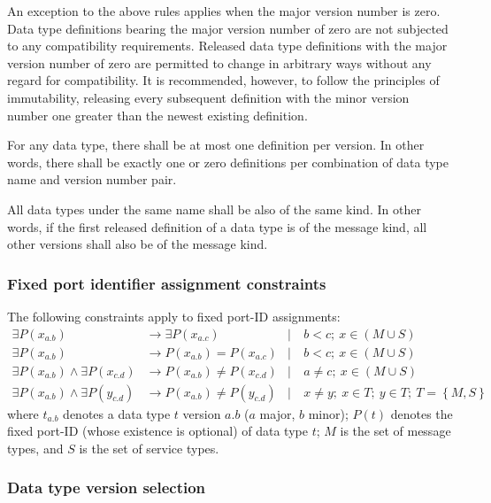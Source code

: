 An exception to the above rules applies when the major version number is zero.
Data type definitions bearing the major version number of zero are not subjected to any compatibility requirements.
Released data type definitions with the major version number of zero are permitted to change in arbitrary
ways without any regard for compatibility.
It is recommended, however, to follow the principles of immutability, releasing every subsequent definition
with the minor version number one greater than the newest existing definition.

For any data type, there shall be at most one definition per version.
In other words, there shall be exactly one or zero definitions
per combination of data type name and version number pair.

All data types under the same name shall be also of the same kind.
In other words, if the first released definition of a data type is of the message kind,
all other versions shall also be of the message kind.

\subsubsection{Fixed port identifier assignment constraints}

The following constraints apply to fixed port-ID assignments:
\begin{align*}
    \exists P(x_{a.b})                          &\rightarrow \exists P(x_{a.c})
    &\mid&\ b < c;\ x \in (M \cup S)
    \\
    \exists P(x_{a.b})                          &\rightarrow         P(x_{a.b}) =    P(x_{a.c})
    &\mid&\ b < c;\ x \in (M \cup S)
    \\
    \exists P(x_{a.b}) \land \exists P(x_{c.d}) &\rightarrow         P(x_{a.b}) \neq P(x_{c.d})
    &\mid&\ a \neq c;\ x \in (M \cup S)
    \\
    \exists P(x_{a.b}) \land \exists P(y_{c.d}) &\rightarrow         P(x_{a.b}) \neq P(y_{c.d})
    &\mid&\ x \neq y;\ x \in T;\ y \in T;\ T = \left\{ M, S \right\}
\end{align*}
where $t_{a.b}$ denotes a data type $t$ version $a.b$ ($a$ major, $b$ minor);
$P(t)$ denotes the fixed port-ID (whose existence is optional) of data type $t$;
$M$ is the set of message types, and $S$ is the set of service types.

\subsubsection{Data type version selection}

